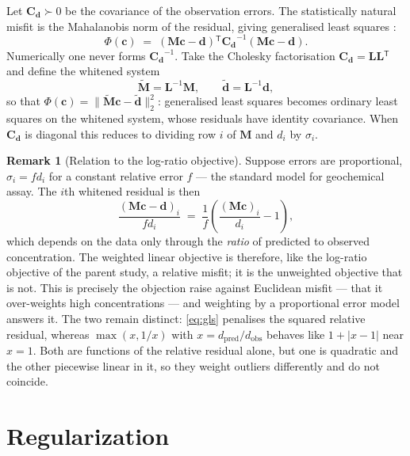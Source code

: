 \documentclass[11pt]{article}
\newcommand{\cvec}{\ensuremath{\mathbf{c}}\xspace}
\newcommand{\dvec}{\ensuremath{\mathbf{d}}\xspace}
\newcommand{\Mmat}{\ensuremath{\mathbf{M}}\xspace}
\newcommand{\Cd}{\ensuremath{\mathbf{C}_{\mathbf{d}}}\xspace}
\newcommand{\transpose}{\ensuremath{^{\mathsf{T}}}}
\theoremstyle{definition}
\newtheorem{remark}[theorem]{Remark}
\begin{document}
Let $\Cd \succ 0$ be the covariance of the observation errors. The statistically natural misfit
is the Mahalanobis norm of the residual, giving generalised least squares
\parencite{menke_geophysical_2012, aster_parameter_2018}:
\begin{equation}
  \Phi(\cvec) \;=\; (\Mmat\cvec - \dvec)\transpose \Cd^{-1} (\Mmat\cvec - \dvec) .
  \label{eq:gls}
\end{equation}
Numerically one never forms $\Cd^{-1}$. Take the Cholesky factorisation $\Cd = \mathbf{L}
\mathbf{L}\transpose$ \parencite{golub_matrix_2013} and define the whitened system
\begin{equation}
  \widetilde{\Mmat} = \mathbf{L}^{-1}\Mmat, \qquad
  \tilde{\dvec} = \mathbf{L}^{-1}\dvec ,
  \label{eq:whitening}
\end{equation}
so that $\Phi(\cvec) = \lVert \widetilde{\Mmat}\cvec - \tilde{\dvec}\rVert_2^2$: generalised
least squares becomes ordinary least squares on the whitened system, whose residuals have
identity covariance. When $\Cd$ is diagonal this reduces to dividing row $i$ of $\Mmat$ and
$d_i$ by $\sigma_i$.

\begin{remark}[Relation to the log-ratio objective]
\label{rem:logratio}
Suppose errors are proportional, $\sigma_i = f d_i$ for a constant relative error $f$ --- the
standard model for geochemical assay. The $i$th whitened residual is then
\begin{equation}
  \frac{(\Mmat\cvec - \dvec)_i}{f d_i}
  \;=\; \frac{1}{f}\left( \frac{(\Mmat\cvec)_i}{d_i} - 1 \right) ,
\end{equation}
which depends on the data only through the \textit{ratio} of predicted to observed
concentration. The weighted linear objective is therefore, like the log-ratio objective of the
parent study, a relative misfit; it is the unweighted objective that is not. This is precisely
the objection \textcite{barnes_using_2024} raise against Euclidean misfit --- that it
over-weights high concentrations --- and weighting by a proportional error model answers it.
The two remain distinct: \eqref{eq:gls} penalises the squared relative residual, whereas
$\max(x, 1/x)$ with $x = d_{\text{pred}}/d_{\text{obs}}$ behaves like $1 + |x - 1|$ near
$x = 1$. Both are functions of the relative residual alone, but one is quadratic and the other
piecewise linear in it, so they weight outliers differently and do not coincide.
\end{remark}

\section{Regularization}
\label{sec:regularization}
\end{document}
